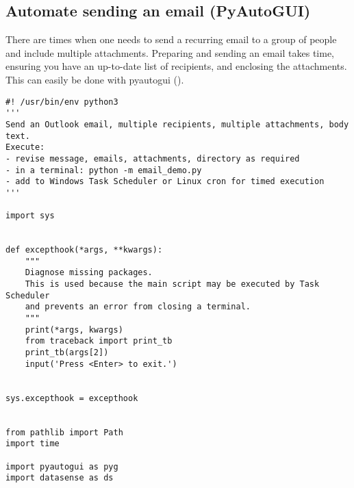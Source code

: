 \documentclass[10pt, letterpaper, twoside]{article}
\begin{document}
\subsection{Automate sending an email (PyAutoGUI)}\label{sec:automate_sending_an_email}
There are times when one needs to send a recurring email to a group of people and include multiple attachments. Preparing and sending an email takes time, ensuring you have an up-to-date list of recipients, and enclosing the attachments. This can easily be done with \Gls{pyautogui} (\cite{pyautogui}).
\begin{footnotesize}
\begin{verbatim}
#! /usr/bin/env python3
'''
Send an Outlook email, multiple recipients, multiple attachments, body text.
Execute:
- revise message, emails, attachments, directory as required
- in a terminal: python -m email_demo.py
- add to Windows Task Scheduler or Linux cron for timed execution
'''

import sys


def excepthook(*args, **kwargs):
    """
    Diagnose missing packages.
    This is used because the main script may be executed by Task Scheduler
    and prevents an error from closing a terminal.
    """
    print(*args, kwargs)
    from traceback import print_tb
    print_tb(args[2])
    input('Press <Enter> to exit.')


sys.excepthook = excepthook


from pathlib import Path
import time

import pyautogui as pyg
import datasense as ds



\end{verbatim}
\end{footnotesize}
\end{document}
